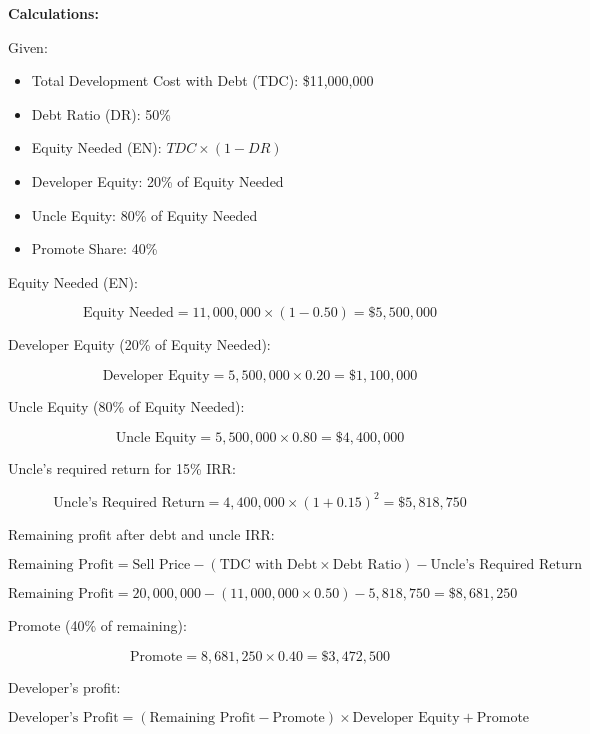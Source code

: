 \documentclass[a1paper]{article}
\begin{document}
\begin{itemize}
\begin{itemize}
        \textbf{Calculations:}
        
        Given:
        \begin{itemize}
            \item Total Development Cost with Debt (TDC): \$11,000,000
            \item Debt Ratio (DR): 50\%
            \item Equity Needed (EN): \( TDC \times (1 - DR) \)
            \item Developer Equity: 20\% of Equity Needed
            \item Uncle Equity: 80\% of Equity Needed
            \item Promote Share: 40\%
        \end{itemize}
        
        Equity Needed (EN):
        
        \[
        \text{Equity Needed} = 11,000,000 \times (1 - 0.50) = \$5,500,000
        \]
        
        Developer Equity (20\% of Equity Needed):
        
        \[
        \text{Developer Equity} = 5,500,000 \times 0.20 = \$1,100,000
        \]
        
        Uncle Equity (80\% of Equity Needed):
        
        \[
        \text{Uncle Equity} = 5,500,000 \times 0.80 = \$4,400,000
        \]
        
        Uncle's required return for 15\% IRR:
        
        \[
        \text{Uncle's Required Return} = 4,400,000 \times (1 + 0.15)^2 = \$5,818,750
        \]
        
        Remaining profit after debt and uncle IRR:
        
        \[
        \text{Remaining Profit} = \text{Sell Price} - (\text{TDC with Debt} \times \text{Debt Ratio}) - \text{Uncle's Required Return}
        \]
        
        \[
        \text{Remaining Profit} = 20,000,000 - (11,000,000 \times 0.50) - 5,818,750 = \$8,681,250
        \]
        
        Promote (40\% of remaining):
        
        \[
        \text{Promote} = 8,681,250 \times 0.40 = \$3,472,500
        \]
        
        Developer's profit:
        
        \[
        \text{Developer's Profit} = (\text{Remaining Profit} - \text{Promote}) \times \text{Developer Equity} + \text{Promote}
        \]
        

\end{itemize}
\end{itemize}
\end{document}
